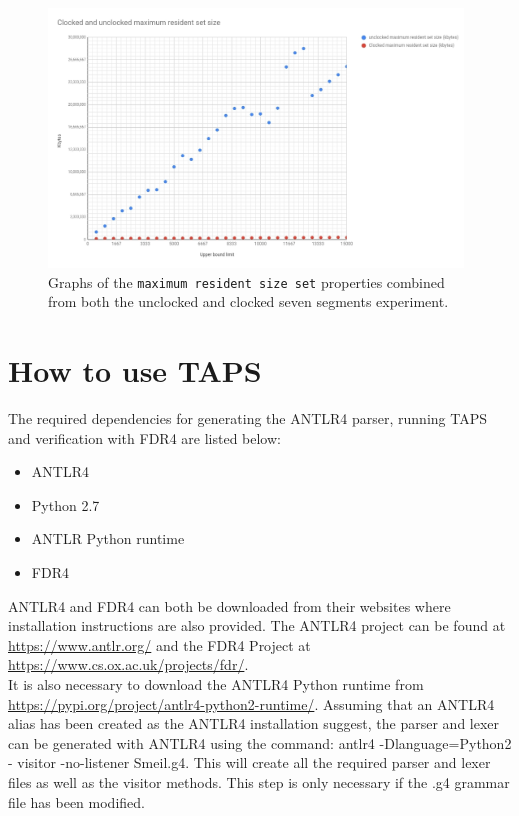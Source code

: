 \begin{figure}
    \includegraphics[width=0.98\textwidth]{./figures/temporary_graphs/combined_maximum_resident_set_size.jpg}
\caption{Graphs of the \texttt{maximum resident size set} properties combined from both the unclocked and clocked seven segments experiment.}
\label{fig:combined_resident_size}
\end{figure}







\newpage
\section{How to use TAPS}
The required dependencies for generating the ANTLR4 parser, running TAPS and verification with FDR4 are listed below:
\begin{itemize}
    \item ANTLR4
    \item Python 2.7
    \item ANTLR Python runtime
    \item FDR4
\end{itemize}

ANTLR4 and FDR4 can both be downloaded from their websites where installation instructions are also provided.
The ANTLR4 project can be found at \url{https://www.antlr.org/} and the FDR4 Project at \url{https://www.cs.ox.ac.uk/projects/fdr/}.\\
It is also necessary to download the ANTLR4 Python runtime from \url{https://pypi.org/project/antlr4-python2-runtime/}.
Assuming that an ANTLR4 alias has been created as the ANTLR4 installation suggest, the parser and lexer can be generated with ANTLR4 using the command: {\ttfamily antlr4 -Dlanguage=Python2 - visitor -no-listener Smeil.g4.}
This will create all the required parser and lexer files as well as the visitor methods. This step is only necessary if the .g4 grammar file has been modified.\\


